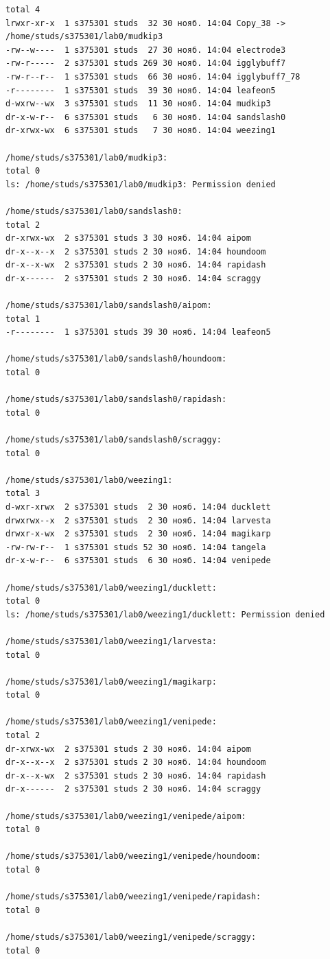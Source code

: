     \begin{lstlisting}[caption={Дерево файлов},label={lst:tree}]
total 4
lrwxr-xr-x  1 s375301 studs  32 30 нояб. 14:04 Copy_38 -> /home/studs/s375301/lab0/mudkip3
-rw--w----  1 s375301 studs  27 30 нояб. 14:04 electrode3
-rw-r-----  2 s375301 studs 269 30 нояб. 14:04 igglybuff7
-rw-r--r--  1 s375301 studs  66 30 нояб. 14:04 igglybuff7_78
-r--------  1 s375301 studs  39 30 нояб. 14:04 leafeon5
d-wxrw--wx  3 s375301 studs  11 30 нояб. 14:04 mudkip3
dr-x-w-r--  6 s375301 studs   6 30 нояб. 14:04 sandslash0
dr-xrwx-wx  6 s375301 studs   7 30 нояб. 14:04 weezing1

/home/studs/s375301/lab0/mudkip3:
total 0
ls: /home/studs/s375301/lab0/mudkip3: Permission denied

/home/studs/s375301/lab0/sandslash0:
total 2
dr-xrwx-wx  2 s375301 studs 3 30 нояб. 14:04 aipom
dr-x--x--x  2 s375301 studs 2 30 нояб. 14:04 houndoom
dr-x--x-wx  2 s375301 studs 2 30 нояб. 14:04 rapidash
dr-x------  2 s375301 studs 2 30 нояб. 14:04 scraggy

/home/studs/s375301/lab0/sandslash0/aipom:
total 1
-r--------  1 s375301 studs 39 30 нояб. 14:04 leafeon5

/home/studs/s375301/lab0/sandslash0/houndoom:
total 0

/home/studs/s375301/lab0/sandslash0/rapidash:
total 0

/home/studs/s375301/lab0/sandslash0/scraggy:
total 0

/home/studs/s375301/lab0/weezing1:
total 3
d-wxr-xrwx  2 s375301 studs  2 30 нояб. 14:04 ducklett
drwxrwx--x  2 s375301 studs  2 30 нояб. 14:04 larvesta
drwxr-x-wx  2 s375301 studs  2 30 нояб. 14:04 magikarp
-rw-rw-r--  1 s375301 studs 52 30 нояб. 14:04 tangela
dr-x-w-r--  6 s375301 studs  6 30 нояб. 14:04 venipede

/home/studs/s375301/lab0/weezing1/ducklett:
total 0
ls: /home/studs/s375301/lab0/weezing1/ducklett: Permission denied

/home/studs/s375301/lab0/weezing1/larvesta:
total 0

/home/studs/s375301/lab0/weezing1/magikarp:
total 0

/home/studs/s375301/lab0/weezing1/venipede:
total 2
dr-xrwx-wx  2 s375301 studs 2 30 нояб. 14:04 aipom
dr-x--x--x  2 s375301 studs 2 30 нояб. 14:04 houndoom
dr-x--x-wx  2 s375301 studs 2 30 нояб. 14:04 rapidash
dr-x------  2 s375301 studs 2 30 нояб. 14:04 scraggy

/home/studs/s375301/lab0/weezing1/venipede/aipom:
total 0

/home/studs/s375301/lab0/weezing1/venipede/houndoom:
total 0

/home/studs/s375301/lab0/weezing1/venipede/rapidash:
total 0

/home/studs/s375301/lab0/weezing1/venipede/scraggy:
total 0
    \end{lstlisting}

